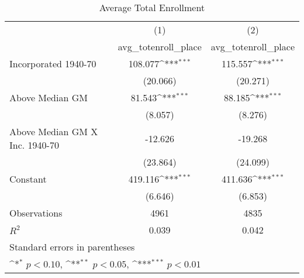 \begin{table}[htbp]\centering
\def\sym#1{\ifmmode^{#1}\else\(^{#1}\)\fi}
\caption{Average Total Enrollment}
\begin{tabular}{l*{2}{c}}
\hline\hline
                    &\multicolumn{1}{c}{(1)}&\multicolumn{1}{c}{(2)}\\
                    &\multicolumn{1}{c}{avg\_totenroll\_place}&\multicolumn{1}{c}{avg\_totenroll\_place}\\
\hline
Incorporated 1940-70&     108.077\sym{***}&     115.557\sym{***}\\
                    &    (20.066)         &    (20.271)         \\
[1em]
Above Median GM     &      81.543\sym{***}&      88.185\sym{***}\\
                    &     (8.057)         &     (8.276)         \\
[1em]
Above Median GM X Inc. 1940-70&     -12.626         &     -19.268         \\
                    &    (23.864)         &    (24.099)         \\
[1em]
Constant            &     419.116\sym{***}&     411.636\sym{***}\\
                    &     (6.646)         &     (6.853)         \\
\hline
Observations        &        4961         &        4835         \\
\(R^{2}\)           &       0.039         &       0.042         \\
\hline\hline
\multicolumn{3}{l}{\footnotesize Standard errors in parentheses}\\
\multicolumn{3}{l}{\footnotesize \sym{*} \(p<0.10\), \sym{**} \(p<0.05\), \sym{***} \(p<0.01\)}\\
\end{tabular}
\end{table}
